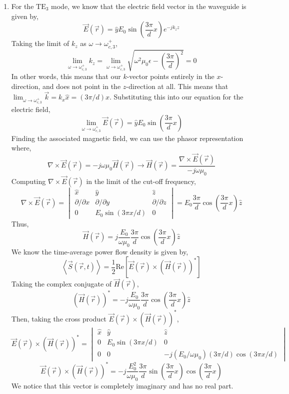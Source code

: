 \documentclass[12pt]{article}
\begin{document}
\begin{enumerate}
\begin{enumerate}
		\item [(c)]
		For the $\mathrm{TE}_3$ mode, we know that the electric field vector in the waveguide is given by,
		\[\vec E(\vec r)=\hat y E_0\sin\left(\frac{3\pi}{d}x\right)e^{-jk_zz}\]
		Taking the limit of $k_z$ as $\omega \to \omega_{c,3}^+$,
		\[\lim_{\omega \to \omega_{c,3}^+}k_z = \lim_{\omega \to \omega_{c,3}^+}\sqrt{\omega^2\mu_0\epsilon-\left(\frac{3\pi}{d}\right)^2}=0\]
		In other words, this means that our $k$-vector points entirely in the $x$-direction, and does not point in the $z$-direction at all.
		This means that $\lim_{\omega\to\omega_{c,3}^+}\vec k = k_x\hat x=(3\pi/d)\hat x$.
		Substituting this into our equation for the electric field,
		\[\lim_{\omega \to \omega_{c,3}^+}\vec E(\vec r)=\hat y E_0\sin\left(\frac{3\pi}{d}x\right)\]
		Finding the associated magnetic field, we can use the phasor representation where,
		\[\nabla \times \vec E(\vec r)=-j\omega \mu_0\vec H(\vec r)\to \vec H(\vec r)=\frac{\nabla\times \vec E(\vec r)}{-j\omega \mu_0}\]
		Computing $\nabla \times \vec E(\vec r)$ in the limit of the cut-off frequency,
		\[\nabla \times \vec E(\vec r)=\begin{vmatrix}
			\hat x & \hat y & \hat z \\ 
			\partial /\partial x & \partial/\partial y & \partial/\partial z \\ 
			0 & E_0\sin(3\pi x/d) & 0
		\end{vmatrix}=E_0\frac{3\pi}{d}\cos\left(\frac{3\pi}{d}x\right)\hat z\]
		Thus,
		\[\vec H(\vec r)=j\frac{E_0}{\omega\mu_0}\frac{3\pi}{d}\cos\left(\frac{3\pi}{d}x\right)\hat z\]
		We know the time-average power flow density is given by,
		\[\left\langle \vec S(\vec r,t)\right \rangle = \frac{1}{2}\mathrm{Re}\left[\vec E(\vec r)\times (\vec H(\vec r))^*\right]\]
		Taking the complex conjugate of $\vec H(\vec r)$,
		\[(\vec H(\vec r))^*=-j\frac{E_0}{\omega\mu_0}\frac{3\pi}{d}\cos\left(\frac{3\pi}{d}x\right)\hat z\]
		Then, taking the cross product $\vec E(\vec r)\times (\vec H(\vec r))^*$,
		\[\vec E(\vec r)\times (\vec H(\vec r))^*=\begin{vmatrix}
			\hat x & \hat y & \hat z \\ 
			0 & E_0\sin(3\pi x/d) & 0 \\ 
			0 & 0 & -j(E_0/\omega \mu_0)(3\pi/d)\cos(3\pi x/d)	
		\end{vmatrix}\]
		\[\vec E(\vec r)\times (\vec H(\vec r))^*=-j\frac{E_0^2}{\omega \mu_0}\frac{3\pi}{d}\sin\left(\frac{3\pi}{d}x\right)\cos\left(\frac{3\pi}{d}x\right)\]
		We notice that this vector is completely imaginary and has no real part.

\end{enumerate}
\end{enumerate}
\end{document}
